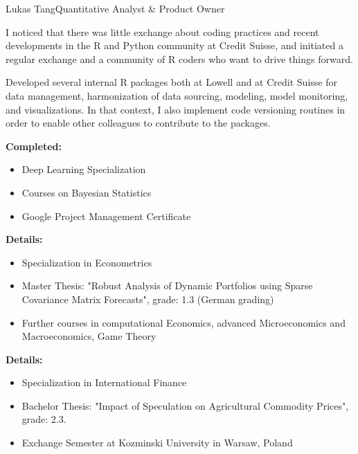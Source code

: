 \documentclass{article}
\begin{document}
\begin{cv}[avatar]{Lukas Tang}{Quantitative Analyst \& Product Owner}
\begin{cvevent}[2022][2023]
    I noticed that there was little exchange about coding practices and recent developments in the R and Python community at Credit Suisse, and initiated a regular exchange and a community of R coders who want to drive things forward.
\end{cvevent}

\begin{cvevent}[2018][2023]
    Developed several internal R packages both at Lowell and at Credit Suisse for data management, harmonization of data sourcing, modeling, model monitoring, and visualizations. In that context, I also implement code versioning routines in order to enable other colleagues to contribute to the packages.
\end{cvevent}

\begin{cvevent}[2020][2023]
    \textbf{Completed:}
    \begin{itemize}
        \item Deep Learning Specialization
        \item Courses on Bayesian Statistics
        \item Google Project Management Certificate
    \end{itemize}
\end{cvevent}

\begin{cvevent}[2013][2016]
    \textbf{Details:}
    \begin{itemize}
        \item Specialization in Econometrics 
        \item Master Thesis: "Robust Analysis of Dynamic Portfolios using Sparse Covariance Matrix Forecasts", grade: 1.3 (German grading)
        \item Further courses in computational Economics, advanced Microeconomics and Macroeconomics, Game Theory
    \end{itemize}
\end{cvevent}

\begin{cvevent}[2010][2013]
    \textbf{Details:}
    \begin{itemize}
        \item Specialization in International Finance
        \item Bachelor Thesis: "Impact of Speculation on Agricultural Commodity Prices", grade: 2.3. 
        \item Exchange Semester at Kozminski University in Warsaw, Poland
    \end{itemize}
\end{cvevent}


\end{cv}
\end{document}
